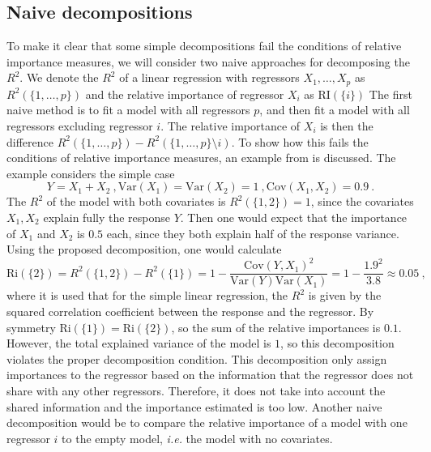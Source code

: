 \subsection{Naive decompositions}
\label{sec:naive_decomp}
To make it clear that some simple decompositions fail the conditions of relative importance measures, we will consider two naive approaches for decomposing the $R^2$. 
We denote the $R^2$ of a linear regression with regressors $X_1, \dots, X_p$ as $R^2(\{1, \dots, p\})$ and the relative importance of regressor $X_i$ as $\text{RI}(\{i\})$
\newline
\newline
The first naive method is to fit a model with all regressors $p$, and then fit a model with all regressors excluding regressor $i$. The relative importance of $X_i$ is then the difference $R^2(\{1, \dots, p\}) - R^2(\{1, \dots, p\} \setminus i)$.
To show how this fails the conditions of relative importance measures, an example from \citet{matre} is discussed. The example considers the simple case 
\begin{equation}
    Y=X_1+X_2 \ , \text{Var}(X_1) = \text{Var}(X_2)=1 \ , \text{Cov}(X_1, X_2)=0.9 \ .
\end{equation}
The $R^2$ of the model with both covariates is $R^2(\{1, 2\})=1$, since the covariates $X_1, X_2$ explain fully the response $Y$. Then one would expect that the importance of $X_1$ and $X_2$ is $0.5$ each, since they both explain half of the response variance.
Using the proposed decomposition, one would calculate
\begin{equation}
    \text{Ri}(\{2\}) = R^2(\{1, 2\}) - R^2(\{1\}) = 1 - \frac{\text{Cov}(Y, X_1)^2}{\text{Var}(Y)\text{Var}(X_1)} = 1- \frac{1.9^2}{3.8} \approx 0.05 \ ,
\end{equation}
where it is used that for the simple linear regression, the $R^2$ is given by the squared correlation coefficient between the response and the regressor.
By symmetry $\text{Ri}(\{1\})=\text{Ri}(\{2\})$, so the sum of the relative importances is $0.1$. However, the total explained variance of the model is $1$, so this decomposition violates the proper decomposition condition.
This decomposition only assign importances to the regressor based on the information that the regressor does not share with any other regressors. Therefore, it does not take into account the shared information and the importance estimated is too low.
\newline
\newline
Another naive decomposition would be to compare the relative importance of a model with one regressor $i$ to the empty model, \textit{i.e.} the model with no covariates. 
